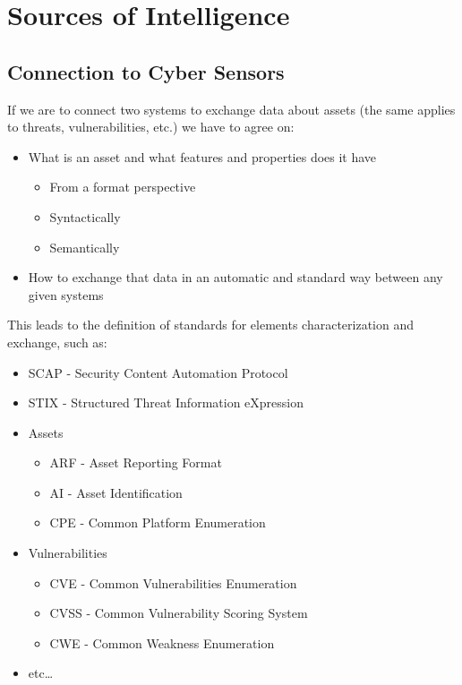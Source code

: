 \chapter{Sources of Intelligence}


\section{Connection to Cyber Sensors}
If we are to connect two systems to exchange data about assets (the same applies
to threats, vulnerabilities, etc.) we have to agree on:
\begin{itemize}
	\item What is an asset and what features and properties does it have
	\begin{itemize}
      \item From a format perspective
      \item Syntactically
      \item Semantically
   \end{itemize}
	\item How to exchange that data in an automatic and standard way between any given systems
\end{itemize}

This leads to the definition of standards for elements characterization and exchange, such as:
\begin{itemize}
   \item SCAP - Security Content Automation Protocol
   \item STIX - Structured Threat Information eXpression
   \item Assets
   \begin{itemize}
      \item ARF - Asset Reporting Format
      \item AI - Asset Identification
      \item CPE - Common Platform Enumeration 
   \end{itemize}

   \item Vulnerabilities
   \begin{itemize}
      \item CVE - Common Vulnerabilities Enumeration
      \item CVSS - Common Vulnerability Scoring System
      \item CWE - Common Weakness Enumeration
   \end{itemize}
   \item etc\dots
\end{itemize}

